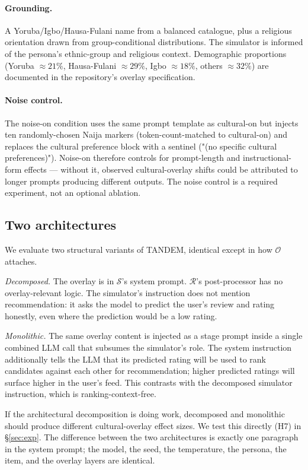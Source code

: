 \documentclass[8pt,twocolumn,a4paper]{extarticle}
\begin{document}
\paragraph{Grounding.}
A Yoruba/Igbo/Hausa-Fulani name from a balanced catalogue, plus a religious orientation drawn from group-conditional distributions. The simulator is informed of the persona's ethnic-group and religious context. Demographic proportions (Yoruba $\approx 21\%$, Hausa-Fulani $\approx 29\%$, Igbo $\approx 18\%$, others $\approx 32\%$) are documented in the repository's overlay specification.

\paragraph{Noise control.}
The noise-on condition uses the same prompt template as cultural-on but injects ten randomly-chosen Naija markers (token-count-matched to cultural-on) and replaces the cultural preference block with a sentinel ("(no specific cultural preferences)"). Noise-on therefore controls for prompt-length and instructional-form effects --- without it, observed cultural-overlay shifts could be attributed to longer prompts producing different outputs. The noise control is a required experiment, not an optional ablation.

\subsection{Two architectures}
\label{sec:method:arch}

We evaluate two structural variants of TANDEM, identical except in how $\mathcal{O}$ attaches.

\textit{Decomposed.} The overlay is in $\mathcal{S}$'s system prompt. $\mathcal{R}$'s post-processor has no overlay-relevant logic. The simulator's instruction does not mention recommendation: it asks the model to predict the user's review and rating honestly, even where the prediction would be a low rating.

\textit{Monolithic.} The same overlay content is injected as a stage prompt inside a single combined LLM call that subsumes the simulator's role. The system instruction additionally tells the LLM that its predicted rating will be used to rank candidates against each other for recommendation; higher predicted ratings will surface higher in the user's feed. This contrasts with the decomposed simulator instruction, which is ranking-context-free.

If the architectural decomposition is doing work, decomposed and monolithic should produce different cultural-overlay effect sizes. We test this directly (H7) in \S\ref{sec:exp}. The difference between the two architectures is exactly one paragraph in the system prompt; the model, the seed, the temperature, the persona, the item, and the overlay layers are identical.
\end{document}
